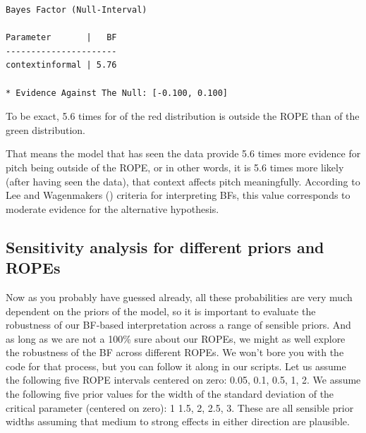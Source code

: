 \documentclass[
  doc,
  longtable,
  nolmodern,
  notxfonts,
  notimes,
  colorlinks=true,linkcolor=blue,citecolor=blue,urlcolor=blue]{apa7}
\begin{document}
\begin{verbatim}
Bayes Factor (Null-Interval)

Parameter       |   BF
----------------------
contextinformal | 5.76

* Evidence Against The Null: [-0.100, 0.100]
\end{verbatim}

To be exact, 5.6 times for of the red distribution is outside the ROPE
than of the green distribution.

That means the model that has seen the data provide 5.6 times more
evidence for pitch being outside of the ROPE, or in other words, it is
5.6 times more likely (after having seen the data), that context affects
pitch meaningfully. According to Lee and Wagenmakers
() criteria for
interpreting BFs, this value corresponds to moderate evidence for the
alternative hypothesis.

\subsection{Sensitivity analysis for different priors and
ROPEs}\label{sensitivity-analysis-for-different-priors-and-ropes}

Now as you probably have guessed already, all these probabilities are
very much dependent on the priors of the model, so it is important to
evaluate the robustness of our BF-based interpretation across a range of
sensible priors. And as long as we are not a 100\% sure about our ROPEs,
we might as well explore the robustness of the BF across different
ROPEs. We won't bore you with the code for that process, but you can
follow it along in our scripts. Let us assume the following five ROPE
intervals centered on zero: 0.05, 0.1, 0.5, 1, 2. We assume the
following five prior values for the width of the standard deviation of
the critical parameter (centered on zero): 1 1.5, 2, 2.5, 3. These are
all sensible prior widths assuming that medium to strong effects in
either direction are plausible.
\end{document}
